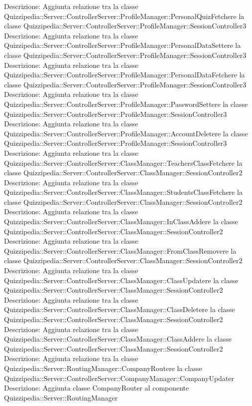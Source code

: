 Descrizione: Aggiunta relazione tra la classe Quizzipedia::Server::ControllerServer::ProfileManager::PersonalQuizFetchere la classe Quizzipedia::Server::ControllerServer::ProfileManager::SessionController3 
Descrizione: Aggiunta relazione tra la classe Quizzipedia::Server::ControllerServer::ProfileManager::PersonalDataSettere la classe Quizzipedia::Server::ControllerServer::ProfileManager::SessionController3 
Descrizione: Aggiunta relazione tra la classe Quizzipedia::Server::ControllerServer::ProfileManager::PersonalDataFetchere la classe Quizzipedia::Server::ControllerServer::ProfileManager::SessionController3 
Descrizione: Aggiunta relazione tra la classe Quizzipedia::Server::ControllerServer::ProfileManager::PasswordSettere la classe Quizzipedia::Server::ControllerServer::ProfileManager::SessionController3 
Descrizione: Aggiunta relazione tra la classe Quizzipedia::Server::ControllerServer::ProfileManager::AccountDeletere la classe Quizzipedia::Server::ControllerServer::ProfileManager::SessionController3 
Descrizione: Aggiunta relazione tra la classe Quizzipedia::Server::ControllerServer::ClassManager::TeachersClassFetchere la classe Quizzipedia::Server::ControllerServer::ClassManager::SessionController2 
Descrizione: Aggiunta relazione tra la classe Quizzipedia::Server::ControllerServer::ClassManager::StudentsClassFetchere la classe Quizzipedia::Server::ControllerServer::ClassManager::SessionController2 
Descrizione: Aggiunta relazione tra la classe Quizzipedia::Server::ControllerServer::ClassManager::InClassAddere la classe Quizzipedia::Server::ControllerServer::ClassManager::SessionController2 
Descrizione: Aggiunta relazione tra la classe Quizzipedia::Server::ControllerServer::ClassManager::FromClassRemovere la classe Quizzipedia::Server::ControllerServer::ClassManager::SessionController2 
Descrizione: Aggiunta relazione tra la classe Quizzipedia::Server::ControllerServer::ClassManager::ClassUpdatere la classe Quizzipedia::Server::ControllerServer::ClassManager::SessionController2 
Descrizione: Aggiunta relazione tra la classe Quizzipedia::Server::ControllerServer::ClassManager::ClassDeletere la classe Quizzipedia::Server::ControllerServer::ClassManager::SessionController2 
Descrizione: Aggiunta relazione tra la classe Quizzipedia::Server::ControllerServer::ClassManager::ClassAddere la classe Quizzipedia::Server::ControllerServer::ClassManager::SessionController2 
Descrizione: Aggiunta relazione tra la classe Quizzipedia::Server::RoutingManager::CompanyRoutere la classe Quizzipedia::Server::ControllerServer::CompanyManager::CompanyUpdater 
Descrizione: Aggiunta classe CompanyRouter al componente Quizzipedia::Server::RoutingManager 
